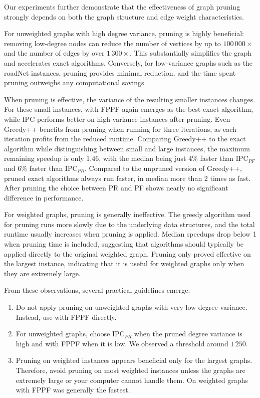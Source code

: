 Our experiments further demonstrate that the effectiveness of graph pruning strongly depends on both the graph structure and edge weight characteristics.

For unweighted graphs with high degree variance, pruning is highly beneficial: removing low-degree nodes can reduce the number of vertices by up to $100\,000\times$ and the number of edges by over $1\,300\times$.
This substantially simplifies the graph and accelerates exact algorithms.
Conversely, for low-variance graphs such as the roadNet instances, pruning provides minimal reduction, and the time spent pruning outweighs any computational savings.

When pruning is effective, the variance of the resulting smaller instances changes.
For these small instances, {\DSPwithFBA} with FPPF again emerges as the best exact algorithm, while IPC performs better on high-variance instances after pruning.
Even Greedy++ benefits from pruning when running for three iterations, as each iteration profits from the reduced runtime.
Comparing Greedy++ to the exact algorithm while distinguishing between small and large instances, the maximum remaining speedup is only 1.46,
with the median being just 4\% faster than IPC$_{PF}$ and 6\% faster than IPC$_{PR}$.
Compared to the unpruned version of Greedy++, pruned exact algorithms always run faster, in median more than 2 times as fast.
After pruning the choice between PR and PF shows nearly no significant difference in performance.

For weighted graphs, pruning is generally ineffective.
The greedy algorithm used for pruning runs more slowly due to the underlying data structures, and the total runtime usually increases when pruning is applied.
Median speedups drop below 1 when pruning time is included, suggesting that algorithms should typically be applied directly to the original weighted graph.
Pruning only proved effective on the largest instance, indicating that it is useful for weighted graphs only when they are extremely large.

From these observations, several practical guidelines emerge:

\begin{enumerate}
    \item
    Do not apply pruning {on unweighted graphs with very low degree variance}.
    Instead, use {\DSPwithFBA} with FPPF directly.
    \item
    For unweighted graphs, choose {IPC$_{PR}$} when the pruned degree variance is high and {\DSPwithFBA} with FPPF when it is low.    We observed a threshold around $1\,250$.

    \item Pruning on weighted instances appears beneficial only for the largest graphs.
        Therefore, avoid pruning on most weighted instances unless the graphs are extremely large or your computer cannot handle them.
        On weighted graphs {\DSPwithFBA} with FPPF was generally the fastest.
\end{enumerate}

